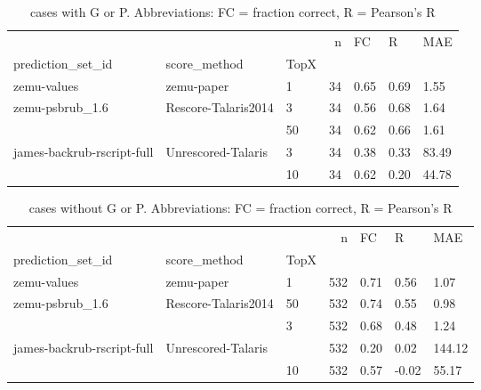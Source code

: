 \documentclass[10pt, letterpaper, oneside, titlepage, landscape]{scrreprt}
\begin{document}
\begin{table}[H]
\begin{tabular}{lllrlll}
\toprule
                           &                     &    &   n &    FC &     R &    MAE \\
prediction\_set\_id & score\_method & TopX &     &       &       &        \\
\midrule
zemu-values & zemu-paper & 1  &  34 &  0.65 &  0.69 &   1.55 \\
zemu-psbrub\_1.6 & Rescore-Talaris2014 & 3  &  34 &  0.56 &  0.68 &   1.64 \\
                           &                     & 50 &  34 &  0.62 &  0.66 &   1.61 \\
james-backrub-rscript-full & Unrescored-Talaris & 3  &  34 &  0.38 &  0.33 &  83.49 \\
                           &                     & 10 &  34 &  0.62 &  0.20 &  44.78 \\
\bottomrule
\end{tabular}
\caption{cases with G or P. Abbreviations: FC = fraction correct, R = Pearson's R}
\end{table}
\begin{table}[H]
\begin{tabular}{lllrlll}
\toprule
                           &                     &    &    n &    FC &      R &     MAE \\
prediction\_set\_id & score\_method & TopX &      &       &        &         \\
\midrule
zemu-values & zemu-paper & 1  &  532 &  0.71 &   0.56 &    1.07 \\
zemu-psbrub\_1.6 & Rescore-Talaris2014 & 50 &  532 &  0.74 &   0.55 &    0.98 \\
                           &                     & 3  &  532 &  0.68 &   0.48 &    1.24 \\
james-backrub-rscript-full & Unrescored-Talaris &    &  532 &  0.20 &   0.02 &  144.12 \\
                           &                     & 10 &  532 &  0.57 &  -0.02 &   55.17 \\
\bottomrule
\end{tabular}
\caption{cases without G or P. Abbreviations: FC = fraction correct, R = Pearson's R}
\end{table}
\end{document}
